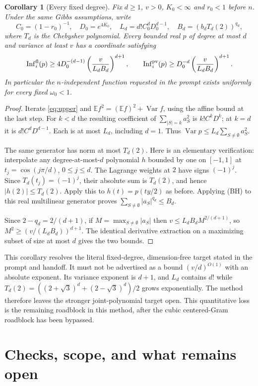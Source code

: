 \documentclass[11pt]{article}
\newtheorem{corollary}[theorem]{Corollary}
\newcommand{\E}{\mathbb E}
\newcommand{\Var}{\operatorname{Var}}
\newcommand{\Inf}{\operatorname{Inf}}
\begin{document}
\begin{corollary}[Every fixed degree]\label{cor:general}
Fix $d\ge1$, $v>0$, $K_0<\infty$ and $r_0<1$ before $n$. Under the
same Gibbs assumptions, write
\[
 C_0=(1-r_0)^{-1},\quad D_0=e^{4K_0},\quad
 L_d=d!C_0^dD_0^{d-1},\quad
 B_d=(b_dT_d(2))^{q_d},
\]
where $T_d$ is the Chebyshev polynomial. Every bounded real $p$ of
degree at most $d$ and variance at least $v$ has a coordinate satisfying
\[
 \Inf_i^{\rm fl}(p)\ge
 4D_0^{-(d-1)}\left(\frac{v}{L_d B_d}\right)^{d+1},\qquad
 \Inf_i^{\rm pv}(p)\ge
 D_0^{-d}\left(\frac{v}{L_d B_d}\right)^{d+1}.
\]
In particular the $n$-independent function requested in the prompt
exists uniformly for every fixed $\omega_0<1$.
\end{corollary}
\begin{proof}
Iterate \eqref{eq:upper} and
$\E f^2=(\E f)^2+\Var f$, using the affine bound at the last
step. For $k<d$ the resulting coefficient of
$\sum_{|S|=k}a_S^2$ is $k!C^kD^k$; at $k=d$ it is
$d!C^dD^{d-1}$. Each is at most $L_d$, including $d=1$.
Thus $\Var p\le L_d\sum_{S\ne\emptyset}a_S^2$.

The same generator has norm at most $T_d(2)$. Here is an elementary
verification: interpolate any degree-at-most-$d$ polynomial $h$
bounded by one on $[-1,1]$ at $t_j=\cos(j\pi/d)$, $0\le j\le d$.
The Lagrange weights at $2$ have signs $(-1)^j$. Since
$T_d(t_j)=(-1)^j$, their absolute sum is $T_d(2)$, and hence
$|h(2)|\le T_d(2)$. Apply this to $h(t)=p(ty/2)$ as before.
Applying (BH) to this real multilinear generator proves
$\sum_{S\ne\emptyset}|a_S|^{q_d}\le B_d$.

Since $2-q_d=2/(d+1)$, if $M=\max_{S\ne\emptyset}|a_S|$ then
$v\le L_dB_dM^{2/(d+1)}$, so
$M^2\ge(v/(L_dB_d))^{d+1}$. The identical derivative extraction
on a maximizing subset of size at most $d$ gives the two bounds.
\end{proof}

This corollary resolves the literal fixed-degree, dimension-free
target stated in the prompt and handoff. It must not be advertised
as a bound $(v/d)^{O(1)}$ with an absolute exponent. Its variance
exponent is $d+1$, and $L_d$ contains $d!$ while
$T_d(2)=((2+\sqrt3)^d+(2-\sqrt3)^d)/2$ grows exponentially.
The method therefore leaves the stronger joint-polynomial target
open. This quantitative loss is the remaining roadblock in this
method, after the cubic centered-Gram roadblock has been bypassed.

\section{Checks, scope, and what remains open}
\end{document}
